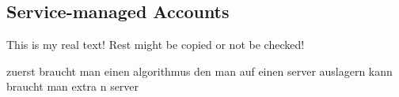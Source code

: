 \subsection{Service-managed Accounts} \label{subsection:evaluation-external-service}
This is my real text! Rest might be copied or not be checked!

zuerst braucht man einen algorithmus den man auf einen server auslagern kann
braucht man extra n server
